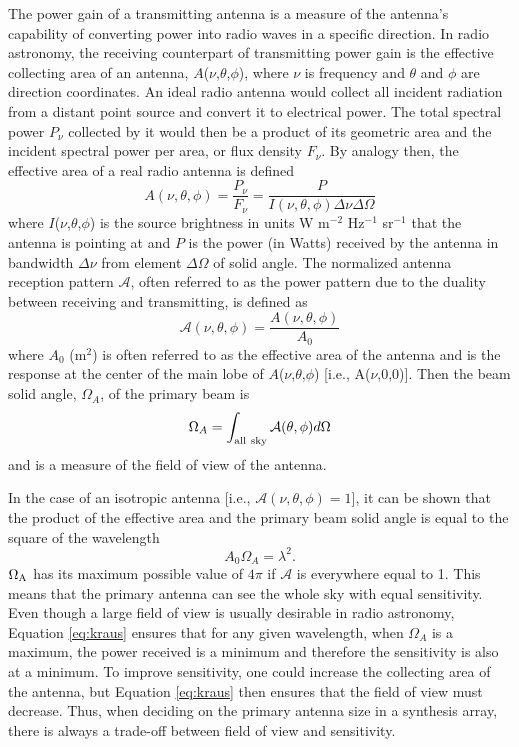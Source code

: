 The power gain of a transmitting antenna is a measure of the antenna's capability of converting power into radio waves in a specific direction. In radio astronomy, the receiving counterpart of transmitting power gain is the effective collecting area of an antenna, $A$($\nu$,$\theta$,$\phi$), where $\nu$ is frequency and $\theta$ and $\phi$ are direction coordinates. An ideal radio antenna would collect all incident radiation from a distant point source and convert it to electrical power. The total spectral power $P_{\nu}$ collected by it would then be a product of its geometric area and the incident spectral power per area, or flux density $F_{\nu}$. By analogy then, the effective area of a real radio antenna is defined
\begin{equation}
A(\nu,\theta,\phi)= \frac{P_{\nu}}{F_{\nu}}=\frac{P}{I(\nu,\theta,\phi)\Delta \nu \Delta \Omega}
\end{equation}
where $I$($\nu$,$\theta$,$\phi$) is the source brightness in units W m$^{-2}$ Hz$^{-1}$ sr$^{-1}$ that the antenna is pointing at and $P$ is the power (in Watts) received by the antenna in bandwidth $\Delta \nu$ from element $\Delta\Omega$ of solid angle. The normalized antenna reception pattern $\mathcal{A}$, often referred to as the power pattern due to the duality between receiving and transmitting, is defined as 
\begin{equation}
\mathcal{A}(\nu,\theta,\phi)= \frac{A(\nu,\theta,\phi)}{A_{0}}
\end{equation}
where $A_0$ (m$^2$) is often referred to as the effective area of the antenna and is the response at the center of the main lobe of $A$($\nu$,$\theta$,$\phi$) [i.e., A($\nu$,0,0)]. Then the beam solid angle, $\Omega _{A}$, of the primary beam is 
\begin{equation}
\Omega _{A} = \int _{\rm{all\ sky}} \mathcal{A}(\theta,\phi) d \Omega
\end{equation}
and is a measure of the field of view of the antenna. 

In the case of an isotropic antenna [i.e., $\mathcal{A}(\nu,\theta,\phi)=1$], it can be shown that the product of the effective area and the primary beam solid angle is equal to the square of the wavelength \citep{kraus_1986}
\begin{equation}\label{eq:kraus}
A_{0}\Omega _{A} = \lambda ^2.
\end{equation}
$\Omega _{\rm{A}}$ has its maximum possible value of $4\pi$ if $\mathcal{A}$ is everywhere equal to 1. This means that the primary antenna can see the whole sky with equal sensitivity. Even though a large field of view is usually desirable in radio astronomy, Equation \ref{eq:kraus} ensures that for any given wavelength, when $\Omega _{A}$ is a maximum, the power received is a minimum and therefore the sensitivity is also at a minimum. To improve sensitivity, one could increase the collecting area of the antenna, but Equation \ref{eq:kraus} then ensures that the field of view must decrease. Thus, when deciding on the primary antenna size in a synthesis array, there is always a trade-off between field of view and sensitivity. 


